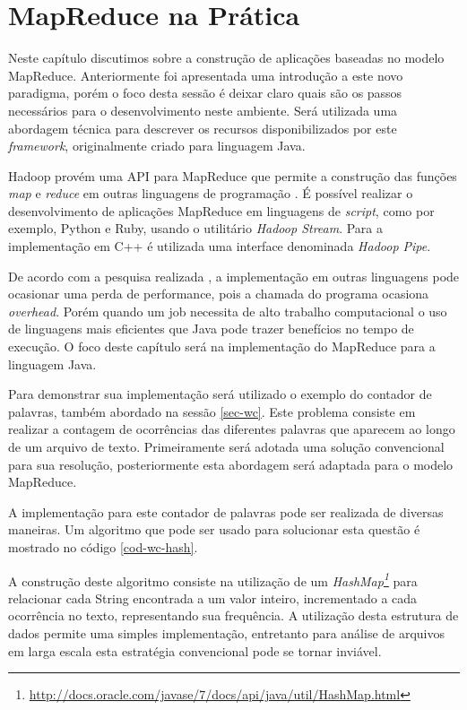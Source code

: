 \chapter{MapReduce na Prática}
\label{cap:mapreduce-devel}

Neste capítulo discutimos sobre a construção de aplicações baseadas no modelo MapReduce. Anteriormente foi apresentada uma introdução a este novo paradigma, porém o foco desta sessão é deixar claro quais são os passos necessários para o desenvolvimento neste ambiente. Será utilizada uma abordagem técnica para descrever os recursos disponibilizados por este \textit{framework}, originalmente criado para linguagem Java.

Hadoop provém uma API para MapReduce que permite a construção das funções \textit{map} e \textit{reduce} em outras linguagens de programação \cite{white2012}. É possível realizar o desenvolvimento de aplicações MapReduce em linguagens de \textit{script}, como por exemplo, Python e Ruby, usando o utilitário \textit{Hadoop Stream}. Para a implementação em C++ é utilizada uma interface denominada \textit{Hadoop Pipe}.

De acordo com a pesquisa realizada , a implementação em outras linguagens pode ocasionar uma perda de performance, pois a chamada do programa ocasiona \textit{overhead}. Porém quando um job necessita de alto trabalho computacional o uso de linguagens mais eficientes que Java pode trazer benefícios no tempo de execução. O foco deste capítulo será na implementação do MapReduce para a linguagem Java.

Para demonstrar sua implementação será utilizado o exemplo do contador de palavras, também abordado na sessão \ref{sec-wc}. Este problema consiste em realizar a contagem de ocorrências das diferentes palavras que aparecem ao longo de um arquivo de texto. Primeiramente será adotada uma solução convencional para sua resolução, posteriormente esta abordagem será adaptada para o modelo MapReduce.

A implementação para este contador de palavras pode ser realizada de diversas maneiras. Um algoritmo que pode ser usado para solucionar esta questão é mostrado no código \ref{cod-wc-hash}.

A construção deste algoritmo consiste na utilização de um \textit{HashMap\footnote{\url{http://docs.oracle.com/javase/7/docs/api/java/util/HashMap.html}}} para relacionar cada String encontrada a um valor inteiro, incrementado a cada ocorrência no texto, representando sua frequência. A utilização desta estrutura de dados permite uma simples implementação, entretanto para análise de arquivos em larga escala esta estratégia convencional pode se tornar inviável.

